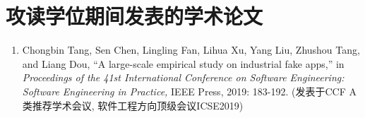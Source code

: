 \chapter*{攻读学位期间发表的学术论文}


\begin{enumerate}
	\item Chongbin Tang, Sen Chen, Lingling Fan, Lihua Xu, Yang Liu, Zhushou Tang, and Liang Dou, ``A large-scale empirical study on industrial fake apps,'' in \textit{Proceedings of the 41st International Conference on Software Engineering: Software Engineering in Practice,} IEEE Press, 2019: 183-192. (发表于CCF A类推荐学术会议, 软件工程方向顶级会议ICSE2019)
\end{enumerate}
